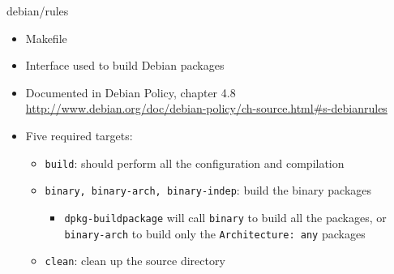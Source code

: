 \documentclass[10pt,final]{beamer}
\begin{document}
\begin{frame}[fragile]{debian/rules}
  \hbr
  \begin{itemize}
  \item Makefile
    \br
  \item Interface used to build Debian packages
    \br
  \item Documented in Debian Policy, chapter 4.8\\
    {\small \url{http://www.debian.org/doc/debian-policy/ch-source.html\#s-debianrules}}
    \br
  \item Five required targets:
    \begin{itemize}
    \item \texttt{build}: should perform all the configuration and compilation
      \hbr
    \item \texttt{binary, binary-arch, binary-indep}: build the binary packages
      \begin{itemize}
      \item \texttt{dpkg-buildpackage} will call \texttt{binary} to build all
        the packages, or \texttt{binary-arch} to build only the
        \texttt{Architecture:~any} packages
      \end{itemize}
      \hbr
    \item \texttt{clean}: clean up the source directory
    \end{itemize}
  \end{itemize}
\end{frame}
\end{document}
